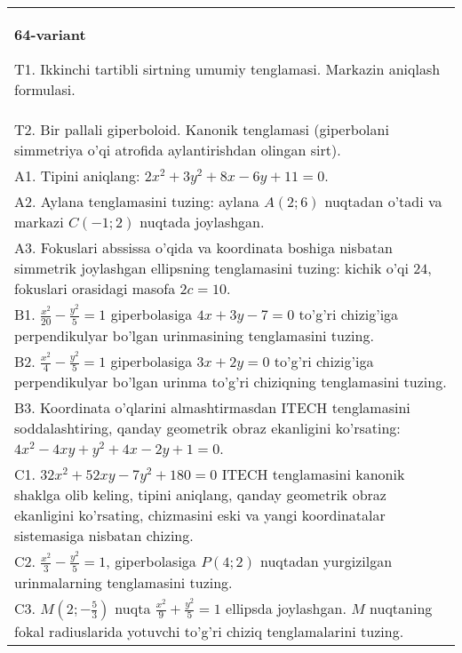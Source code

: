 \documentclass{article}
\begin{document}
\begin{tabular}{m{17cm}}
\textbf{64-variant}
\newline

T1. Ikkinchi tartibli sirtning umumiy tenglamasi. Markazin aniqlash formulasi.\\

T2. Bir pallali giperboloid. Kanonik tenglamasi (giperbolani simmetriya o'qi atrofida aylantirishdan olingan sirt).\\

A1. Tipini aniqlang: $2x^{2}+3y^{2}+8x-6y+11=0$.\\

A2. Aylana tenglamasini tuzing: aylana $A(2;6)$ nuqtadan o'tadi va markazi $C(-1;2)$ nuqtada joylashgan.\\

A3. Fokuslari abssissa o'qida va koordinata boshiga nisbatan simmetrik joylashgan ellipsning tenglamasini tuzing: kichik o'qi $24$, fokuslari orasidagi masofa $2c=10$.\\

B1. $\frac{x^{2}}{20} - \frac{y^{2}}{5} = 1$ giperbolasiga $4x + 3y - 7 = 0$ to'g'ri chizig'iga perpendikulyar bo'lgan urinmasining tenglamasini tuzing.  \\

B2. $\frac{x^{2}}{4} - \frac{y^{2}}{5} = 1$ giperbolasiga $3x + 2y = 0$ to'g'ri chizig'iga perpendikulyar bo'lgan urinma to'g'ri chiziqning tenglamasini tuzing.\\

B3. Koordinata o'qlarini almashtirmasdan ITECH tenglamasini soddalashtiring, qanday geometrik obraz ekanligini ko'rsating: $4x^{2} - 4xy + y^{2} + 4x - 2y + 1 = 0$.  \\

C1. $32x^{2} + 52xy - 7y^{2} + 180 = 0$ ITECH tenglamasini kanonik shaklga olib keling, tipini aniqlang, qanday geometrik obraz ekanligini ko'rsating, chizmasini eski va yangi koordinatalar sistemasiga nisbatan chizing.  \\

C2. $\frac{x^{2}}{3} - \frac{y^{2}}{5} = 1$, giperbolasiga $P(4;2)$ nuqtadan yurgizilgan urinmalarning tenglamasini tuzing.  \\

C3. $M(2; - \frac{5}{3})$ nuqta $\frac{x^{2}}{9} + \frac{y^{2}}{5} = 1$ ellipsda joylashgan. $M$ nuqtaning fokal radiuslarida yotuvchi to'g'ri chiziq tenglamalarini tuzing.  \\

\end{tabular}
\vspace{1cm}
\end{document}

